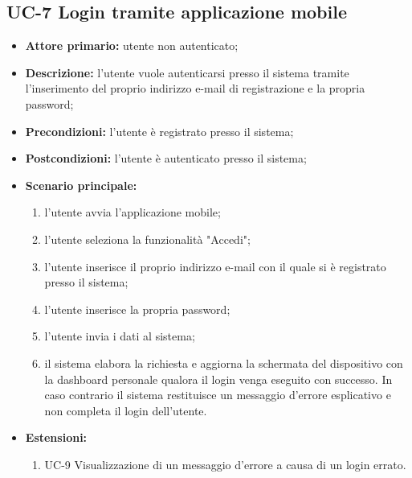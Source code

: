 \subsection{UC-7 Login tramite applicazione mobile}
\begin{itemize}
	\item \textbf{Attore primario:} utente non autenticato;

	\item \textbf{Descrizione:} l'utente vuole autenticarsi presso il sistema tramite l'inserimento del proprio indirizzo e-mail di registrazione e la propria password;

	\item \textbf{Precondizioni:} l'utente è registrato presso il sistema;

	\item \textbf{Postcondizioni:} l'utente è autenticato presso il sistema;

	\item\textbf{Scenario principale:}
	      \begin{enumerate}
		      \item l'utente avvia l'applicazione mobile;
		      \item l'utente seleziona la funzionalità "Accedi";
		      \item l'utente inserisce il proprio indirizzo e-mail con il quale si è registrato presso il sistema;
		      \item l'utente inserisce la propria password;
		      \item l'utente invia i dati al sistema;
		      \item il sistema elabora la richiesta e aggiorna la schermata del dispositivo con la dashboard personale qualora il login venga eseguito con successo. In caso contrario il sistema restituisce un messaggio d'errore esplicativo e non completa il login dell'utente.
	      \end{enumerate}
	\item \textbf{Estensioni:}
	      \begin{enumerate}
		      \item UC-9 Visualizzazione di un messaggio d'errore a causa di un login errato.
	      \end{enumerate}
\end{itemize}
